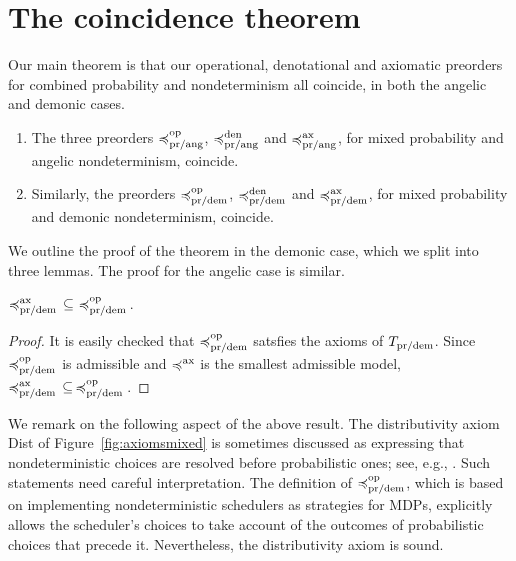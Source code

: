 \section{The coincidence theorem}
\label{section:equivalence}

Our main theorem is that our operational, denotational and axiomatic preorders for combined probability and nondeterminism all coincide, in both the angelic and demonic cases.
\begin{theorem} \leavevmode
\begin{enumerate} 
\item The three preorders $\preccurlyeq^{\text{op}}_{\text{pr/ang}}$, $\preccurlyeq^{\text{den}}_{\text{pr/ang}}$ and $\preccurlyeq^{\text{ax}}_{\text{pr/ang}}$, for mixed probability and angelic nondeterminism, coincide.

\item Similarly, the preorders $\preccurlyeq^{\text{op}}_{\text{pr/dem}}$, $\preccurlyeq^{\text{den}}_{\text{pr/dem}}$ and $\preccurlyeq^{\text{ax}}_{\text{pr/dem}}$,
for mixed probability and demonic nondeterminism, coincide.
\end{enumerate}
\end{theorem}

\noindent
We outline the proof of the theorem in the demonic case, which we split into three lemmas. The proof for the angelic case is similar. 
\begin{lemma}
${\preccurlyeq^{\text{ax}}_{\text{pr/dem}}} \, \subseteq \, \, \preccurlyeq^{\text{op}}_{\text{pr/dem}}\,$.
\end{lemma}
\begin{proof}
 It is easily checked that $\preccurlyeq^{\text{op}}_{\text{pr/dem}}$ satsfies the axioms
 of $T_{\text{pr/dem}}$.  Since $\preccurlyeq^{\text{op}}_{\text{pr/dem}}$ is admissible and 
$\preccurlyeq^{\text{ax}}$ is the smallest admissible model, ${\preccurlyeq^{\text{ax}}_{\text{pr/dem}}} \, \subseteq \, \preccurlyeq^{\text{op}}_{\text{pr/dem}}\,$.
\end{proof}
%
\noindent
We remark on the following aspect of the above result.
The distributivity axiom Dist of Figure~\ref{fig:axiomsmixed} is sometimes discussed as expressing that  nondeterministic choices  are  resolved before probabilistic ones; see, e.g., \cite{mislove2004axioms,KeimelP2016}. Such statements need careful interpretation. 
The definition of $\preccurlyeq^{\text{op}}_{\text{pr/dem}}$, which is based on implementing nondeterministic schedulers as strategies for MDPs,
explicitly allows the  scheduler's choices to take account of the outcomes of probabilistic choices that precede it. Nevertheless, the distributivity axiom is sound.

